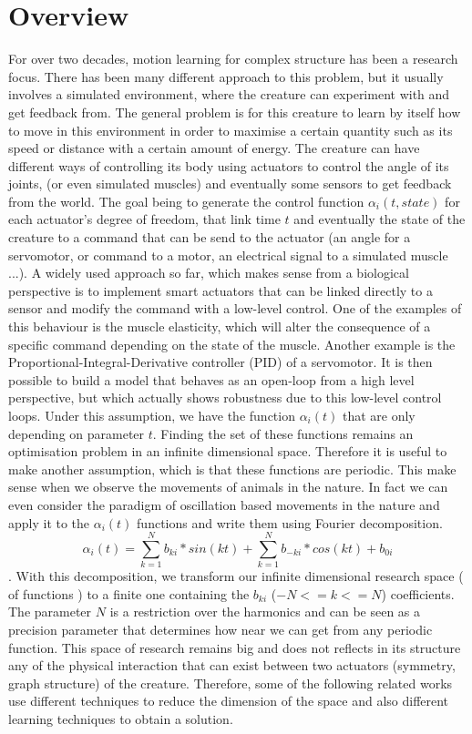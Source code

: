 \section{Overview}
For over two decades, motion learning for complex structure has been a research focus. There has been many different approach to this problem, but it usually involves a simulated environment, where the creature can experiment with and get feedback from. The general problem is for this creature to learn by itself how to move in this environment in order to maximise a certain quantity such as its speed or distance with a certain amount of energy. The creature can have different ways of controlling its body using actuators to control the angle of its joints, (or even simulated muscles) and eventually some sensors to get feedback from the world. The goal being to generate the control function  $\alpha_i(t, state) $ for each actuator's degree of freedom, that link time $t$ and eventually the state of the creature to a command that can be send to the actuator (an angle for a servomotor, or command to a motor, an electrical signal to a simulated muscle ...). A widely used approach so far, which makes sense from a biological perspective is to implement smart actuators that can be linked directly to a sensor and modify the command with a low-level control. One of the examples of this behaviour is the muscle elasticity, which will alter the consequence of a specific command depending on the state of the muscle. Another example is the Proportional-Integral-Derivative controller (PID) of a servomotor. It is then possible to build a model that behaves as an open-loop from a high level perspective, but which actually shows robustness due to this low-level control loops. 
Under this assumption, we have the function $\alpha_i(t)$ that are only depending on parameter $t$. Finding the set of these functions remains an optimisation problem in an infinite dimensional space. Therefore it is useful to make another assumption, which is that these functions are periodic. This make sense when we observe the movements of animals in the nature. In fact we can even consider the paradigm of oscillation based movements in the nature and apply it to the $\alpha_i(t)$ functions and write them using Fourier decomposition. $$\alpha_i(t) = \sum_{k = 1}^N {b_{ki} * sin(kt)} + \sum_{k = 1}^N {b_{-ki} *  cos(kt)} + b_{0i} $$.
With this decomposition, we transform our infinite dimensional research space ( of functions ) to a finite one containing the $b_{ki}$ ($ -N <= k <= N $) coefficients. The parameter $N$ is a restriction over the harmonics and can be seen as a precision parameter that determines how near we can get from any periodic function. This space of research remains big and does not reflects in its structure any of the physical interaction that can exist between two actuators (symmetry, graph structure) of the creature. Therefore, some of the following related works use different techniques to reduce the dimension of the space and also different learning techniques to obtain a solution. 

